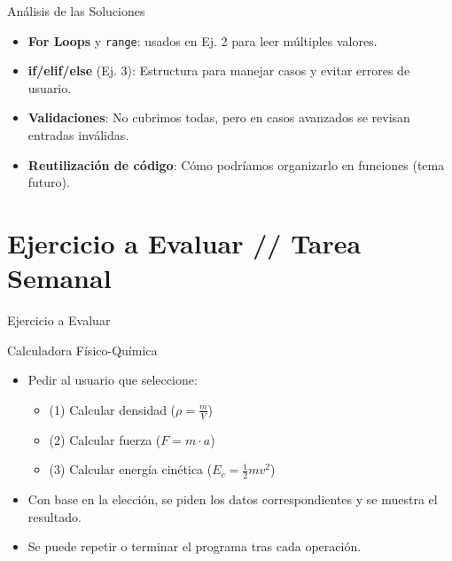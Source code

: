 \documentclass[10pt]{beamer}
\begin{document}
\begin{frame}{Análisis de las Soluciones}
  \begin{itemize}
    \item \textbf{For Loops} y \texttt{range}: usados en Ej. 2 para leer múltiples valores.
    \item \textbf{if/elif/else} (Ej. 3): Estructura para manejar casos y evitar errores de usuario.
    \item \textbf{Validaciones}: No cubrimos todas, pero en casos avanzados se revisan entradas inválidas.
    \item \textbf{Reutilización de código}: Cómo podríamos organizarlo en funciones (tema futuro).
  \end{itemize}
\end{frame}

\section{Ejercicio a Evaluar // Tarea Semanal}
\begin{frame}{Ejercicio a Evaluar}
  \begin{block}{Calculadora Físico-Química}
    \begin{itemize}
      \item Pedir al usuario que seleccione:
        \begin{itemize}
          \item (1) Calcular densidad (\(\rho = \frac{m}{V}\))
          \item (2) Calcular fuerza (\(F = m \cdot a\))
          \item (3) Calcular energía cinética (\(E_c = \frac{1}{2}mv^2\))
        \end{itemize}
      \item Con base en la elección, se piden los datos correspondientes y se muestra el resultado.
      \item Se puede repetir o terminar el programa tras cada operación.
    \end{itemize}
  \end{block}
\end{frame}
\end{document}
